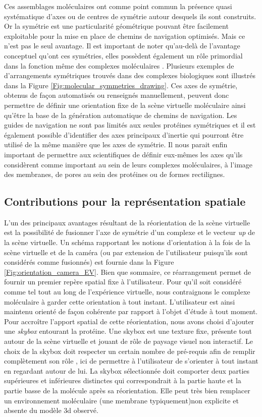 Ces assemblages moléculaires ont comme point commun la présence quasi systématique d'axes ou de centres de symétrie autour desquels ils sont construits. Or la symétrie est une particularité géométrique pouvant être facilement exploitable pour la mise en place de chemins de navigation optimisés. Mais ce n'est pas le seul avantage. Il est important de noter qu'au-delà de l'avantage conceptuel qu'ont ces symétries, elles possèdent également un rôle primordial dans la fonction même des complexes moléculaires \cite{goodsell_structural_2000}. Plusieurs exemples de d'arrangements symétriques trouvés dans des complexes biologiques sont illustrés dans la Figure \ref{Fig:molecular_symmetries_drawing}.
Ces axes de symétrie, obtenus de façon automatisés ou renseignés manuellement, peuvent donc permettre de définir une orientation fixe de la scène virtuelle moléculaire ainsi qu'être la base de la génération automatique de chemins de navigation. Les guides de navigation ne sont pas limités aux seules protéines symétriques et il est également possible d'identifier des axes principaux d'inertie qui pourront être utilisé de la même manière que les axes de symétrie. Il nous parait enfin important de permettre aux scientifiques de définir eux-mêmes les axes qu'ils considèrent comme important au sein de leurs complexes moléculaires, à l'image des membranes, de pores au sein des protéines ou de formes rectilignes.

\subsection{Contributions pour la représentation spatiale}

L'un des principaux avantages résultant de la réorientation de la scène virtuelle est la possibilité de fusionner l'axe de symétrie d'un complexe et le vecteur \textit{up} de la scène virtuelle. Un schéma rapportant les notions d'orientation à la fois de la scène virtuelle et de la caméra (ou par extension de l'utilisateur puisqu'ils sont considérés comme fusionnés) est fournie dans la Figure \ref{Fig:orientation_camera_EV}. 
Bien que sommaire, ce réarrangement permet de fournir un premier repère spatial fixe à l'utilisateur. Pour qu'il soit considéré comme tel tout au long de l'expérience virtuelle, nous contraignons le complexe moléculaire à garder cette orientation à tout instant. L'utilisateur est ainsi maintenu orienté de façon cohérente par rapport à l'objet d'étude à tout moment. Pour accroître l'apport spatial de cette réorientation, nous avons choisi d'ajouter une \textit{skybox} entourant la protéine. Une skybox est une texture fixe, présente tout autour de la scène virtuelle et jouant de rôle de paysage visuel non interactif. Le choix de la skybox doit respecter un certain nombre de pré-requis afin de remplir complètement son rôle \cite{vinson_design_1999}, ici de permettre à l'utilisateur de s'orienter à tout instant en regardant autour de lui. La skybox sélectionnée doit comporter deux parties supérieures et inférieures distinctes qui correspondrait à la partie haute et la partie basse de la molécule après sa réorientation. Elle peut très bien remplacer un environnement moléculaire (une membrane typiquement)non explicite et absente du modèle 3d observé.

